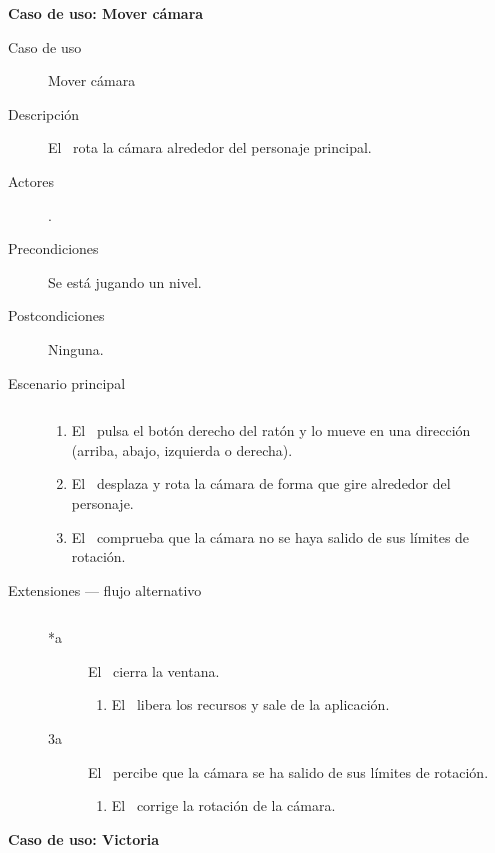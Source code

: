 \textbf{Caso de uso: Mover cámara}

\begin{description}
    \item [Caso de uso] Mover cámara
    \item [Descripción] El \jugador\ rota la cámara alrededor del personaje principal.
    \item [Actores] \jugador.
    \item [Precondiciones] Se está jugando un nivel.
    \item [Postcondiciones] Ninguna.
    \item [Escenario principal] $\quad$
        \begin{enumerate}
            \item El \jugador\ pulsa el botón derecho del ratón y lo mueve
            en una dirección (arriba, abajo, izquierda o derecha).
            \item El \sistema\ desplaza y rota la cámara de forma que gire
            alrededor del personaje.
            \item El \sistema\ comprueba que la cámara no se haya salido
            de sus límites de rotación.
        \end{enumerate}
    \item[Extensiones --- flujo alternativo] $\quad$
        \begin{description}
            \item [*a] El \jugador\ cierra la ventana.
                \begin{enumerate}
                    \item El \sistema\ libera los recursos y sale de la aplicación.
                \end{enumerate}
            \item [3a] El \sistema\ percibe que la cámara se ha salido de sus
            límites de rotación.
                \begin{enumerate}
                    \item El \sistema\ corrige la rotación de la cámara.\\
                \end{enumerate}
        \end{description}
    
\end{description}

\textbf{Caso de uso: Victoria}

